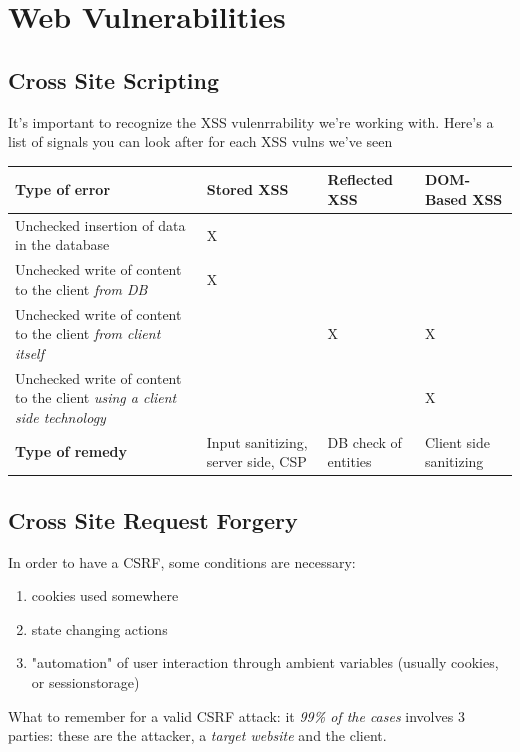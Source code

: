 \documentclass{article}
\begin{document}
		\section{Web Vulnerabilities}
			\subsection{Cross Site Scripting}
				It's important to recognize the XSS vulenrrability we're working with. Here's a list of signals you can look after for each XSS vulns we've seen
				\begin{center}
					\begin{tabular}{ | m{5cm} || m{5em} | m{5em} | m{5em} |}
						\hline
						Type of error & Stored XSS & Reflected XSS & DOM-Based XSS \\
						\hline
						\hline
						Unchecked insertion of data in the database & X & & \\
						\hline
						Unchecked write of content to the client \emph{from DB} & X & & \\
						\hline
						Unchecked write of content to the client \emph{from client itself} & & X & X \\
						\hline
						Unchecked write of content to the client \emph{using a client side technology} & & & X \\
						\hline
						\textbf{Type of remedy} & Input sanitizing, server side, CSP & DB check of entities & Client side sanitizing \\ 
						\hline
					\end{tabular}
				\end{center}
				
			\subsection{Cross Site Request Forgery}
				In order to have a CSRF, some conditions are necessary:
				\begin{enumerate}
					\item cookies used somewhere
					\item state changing actions
					\item "automation" of user interaction through ambient variables (usually cookies, or sessionstorage)
				\end{enumerate}
				What to remember for a valid CSRF attack: it \emph{99\% of the cases} involves 3 parties: these are the attacker, a \emph{target website} and the client.
				
\end{document}
